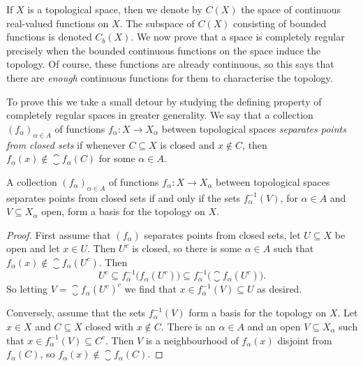 \documentclass[article, a4paper, 11pt, oneside]{memoir}
\numberwithin{equation}{chapter}
\newcommand{\preim}{^{-1}}
\begin{document}
If $X$ is a topological space, then we denote by $C(X)$ the space of continuous real-valued functions on $X$. The subspace of $C(X)$ consisting of bounded functions is denoted $C_b(X)$. We now prove that a space is completely regular precisely when the bounded continuous functions on the space induce the topology. Of course, these functions are already continuous, so this says that there are \emph{enough} continuous functions for them to characterise the topology.

To prove this we take a small detour by studying the defining property of completely regular spaces in greater generality. We say that a collection $(f_\alpha)_{\alpha \in A}$ of functions $f_\alpha \colon X \to X_\alpha$ between topological spaces \emph{separates points from closed sets} if whenever $C \subseteq X$ is closed and $x \not\in C$, then $f_\alpha(x) \not\in \closure{f_\alpha(C)}$ for some $\alpha \in A$.

\begin{proposition}
    \label{thm:separating-points-from-closed-sets-basis}
    A collection $(f_\alpha)_{\alpha \in A}$ of functions $f_\alpha \colon X \to X_\alpha$ between topological spaces separates points from closed sets if and only if the sets $f_\alpha\preim(V)$, for $\alpha \in A$ and $V \subseteq X_\alpha$ open, form a basis for the topology on $X$.
\end{proposition}

\begin{proof}
    First assume that $(f_\alpha)$ separates points from closed sets, let $U \subseteq X$ be open and let $x \in U$. Then $U^c$ is closed, so there is some $\alpha \in A$ such that $f_\alpha(x) \not\in \closure{f_\alpha(U^c)}$. Then
    \begin{equation*}
        U^c
            \subseteq f_\alpha\preim \bigl( f_\alpha(U^c) \bigr)
            \subseteq f_\alpha\preim \bigl( \closure{f_\alpha(U^c)} \bigr).
    \end{equation*}
    So letting $V = \closure{f_\alpha(U^c)}^c$ we find that $x \in f_\alpha\preim(V) \subseteq U$ as desired.

    Conversely, assume that the sets $f_\alpha\preim(V)$ form a basis for the topology on $X$. Let $x \in X$ and $C \subseteq X$ closed with $x \not\in C$. There is an $\alpha \in A$ and an open $V \subseteq X_\alpha$ such that $x \in f_\alpha\preim(V) \subseteq C^c$. Then $V$ is a neighbourhood of $f_\alpha(x)$ disjoint from $f_\alpha(C)$, so $f_\alpha(x) \not\in \closure{f_\alpha(C)}$.
\end{proof}
\end{document}
